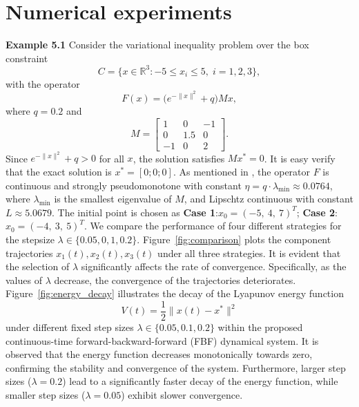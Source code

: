 \documentclass[hidelinks,11 pt]{article}
\numberwithin{equation}{section}
\theoremstyle{definition}  %
\numberwithin{equation}{section}
\numberwithin{theorem}{section}
\begin{document}
\section{Numerical experiments}\label{sec:experiments}
\vskip 2mm 
\textbf{Example 5.1} 
Consider the variational inequality problem over the box constraint
\[
C = \{ x \in \mathbb{R}^3 : -5 \leq x_i \leq 5, \; i=1,2,3 \},
\]
with the operator
\[
F(x) = \bigl( e^{ - \| x \|^2 } + q \bigr) M x,
\]
where \( q = 0.2 \) and
\[
M =
\begin{bmatrix}
1 & 0 & -1 \\ 
0 & 1.5 & 0 \\ 
-1 & 0 & 2
\end{bmatrix}.
\]
Since \( e^{ - \| x \|^2 } + q > 0 \) for all \( x \), the solution satisfies
$M x^* = 0$. It is easy verify that the exact solution is
$x^* = [0; 0; 0]$.
As mentioned in \cite{a22},  the operator $F$ is continuous and strongly pseudomonotone with constant  $\eta = q\cdot\lambda_{\min}\approx0.0764$, where $\lambda_{\min}$ is the smallest eigenvalue of $M$, and Lipschtz continuous with constant $L\approx5.0679$. 
The initial point is chosen as \textbf{Case 1}:$x_0 = (-5,\ 4,\ 7)^T$; \textbf{Case 2}:$x_0 = (-4,\ 3,\ 5)^T$. We compare the performance of four different strategies for the stepsize $\lambda\in\{0.05, 0,1,0.2\}$.
\vskip 2mm 
Figure~\ref{fig:comparison} plots the component trajectories $x_1(t), x_2(t), x_3(t)$ under all three strategies. It is evident that the selection of $\lambda$ significantly affects the rate of convergence. Specifically, as the values of $\lambda$ decrease, the convergence of the trajectories deteriorates.
\vskip 2mm 
Figure~\ref{fig:energy_decay} illustrates the decay of the Lyapunov energy function
\[
V(t) = \frac{1}{2} \| x(t) - x^* \|^2
\]
under different fixed step sizes \(\lambda \in \{0.05, 0.1, 0.2\}\) within the proposed continuous-time forward-backward-forward (FBF) dynamical system. It is observed that the energy function decreases monotonically towards zero, confirming the stability and convergence of the system. Furthermore, larger step sizes (\(\lambda = 0.2\)) lead to a significantly faster decay of the energy function, while smaller step sizes (\(\lambda = 0.05\)) exhibit slower convergence.
\end{document}
